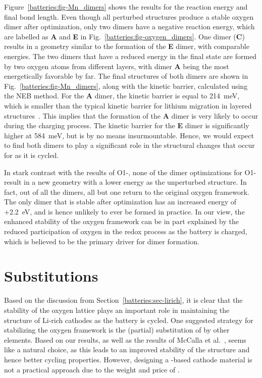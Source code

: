 \begin{refsection}
Figure~\ref{batteries:fig-Mn_dimers} shows the results for the reaction energy 
and final bond length. Even though all perturbed structures 
produce a stable oxygen dimer after optimization, only two dimers have a 
negative reaction energy, which are labelled as \textbf{A} and \textbf{E} 
in Fig.~\ref{batteries:fig-oxygen_dimers}. One dimer (\textbf{C}) results in a 
geometry similar to the formation of the \textbf{E} dimer, with comparable 
energies. The two dimers that have a reduced energy in the final state are 
formed by two oxygen atoms from different layers, with dimer \textbf{A} being 
the most energetically favorable by far. The final structures of both 
dimers are shown in Fig.~\ref{batteries:fig-Mn_dimers}, along with the kinetic barrier, 
calculated using the \gls{NEB} method. For the \textbf{A} dimer, the kinetic barrier 
is equal to 214~\si{\milli\electronvolt}, which is smaller than the typical 
kinetic barrier for lithium migration in layered 
structures~\cite{VanDerVen2013}. This implies that the formation of the 
\textbf{A} dimer is very likely to occur during the charging process. The 
kinetic barrier for the \textbf{E} dimer is significantly higher at 
584~\si{\milli\electronvolt}, but is by no means insurmountable. Hence, we 
would expect to find both dimers to play a significant role in the structural 
changes that occur for  as it is cycled. 
 
In stark contrast with the results of O1-, none of the dimer 
optimizations for O1- result in a new geometry with a lower 
energy as the unperturbed structure. In fact, out of all the dimers, all but 
one return to the original oxygen framework. The only dimer that is stable 
after optimization has an increased energy of +2.2~\si{\electronvolt}, and is 
hence unlikely to ever be formed in practice. In our view, the enhanced 
stability of the oxygen framework can be in part explained by the reduced 
participation of oxygen in the redox process as the battery is charged, which 
is believed to be the primary driver for dimer formation. 
 
\section{Substitutions} \label{batteries:sec-substitutions} 
 
Based on the discussion from Section~\ref{batteries:sec-lirich}, it is clear 
that the stability of the oxygen lattice plays an important role in 
maintaining the structure of Li-rich cathodes as the battery is cycled. One 
suggested strategy for stabilizing the oxygen framework is the (partial) 
substitution of  by other elements. Based on our results, as well 
as the results of McCalla et al.~\cite{McCalla2015},  seems like a 
natural choice, as this leads to an improved stability of the structure and 
hence better cycling properties. However, designing a -based cathode 
material is not a practical approach due to the weight and price of . 
 

\end{refsection}

